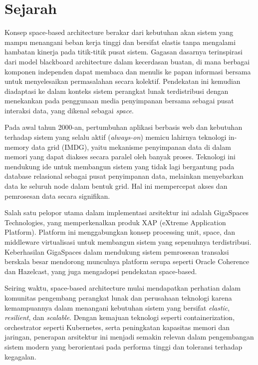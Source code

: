 \section{Sejarah}

Konsep space-based architecture berakar dari kebutuhan akan sistem yang mampu menangani beban kerja tinggi dan bersifat elastis tanpa mengalami hambatan kinerja pada titik-titik pusat sistem. Gagasan dasarnya terinspirasi dari model blackboard architecture dalam kecerdasan buatan, di mana berbagai komponen independen dapat membaca dan menulis ke papan informasi bersama untuk menyelesaikan permasalahan secara kolektif. Pendekatan ini kemudian diadaptasi ke dalam konteks sistem perangkat lunak terdistribusi dengan menekankan pada penggunaan media penyimpanan bersama sebagai pusat interaksi data, yang dikenal sebagai \textit{space}.

Pada awal tahun 2000-an, pertumbuhan aplikasi berbasis web dan kebutuhan terhadap sistem yang selalu aktif (\textit{always-on}) memicu lahirnya teknologi in-memory data grid (IMDG), yaitu mekanisme penyimpanan data di dalam memori yang dapat diakses secara paralel oleh banyak proses. Teknologi ini mendukung ide untuk membangun sistem yang tidak lagi bergantung pada database relasional sebagai pusat penyimpanan data, melainkan menyebarkan data ke seluruh node dalam bentuk grid. Hal ini mempercepat akses dan pemrosesan data secara signifikan.

Salah satu pelopor utama dalam implementasi arsitektur ini adalah GigaSpaces Technologies, yang memperkenalkan produk XAP (eXtreme Application Platform). Platform ini menggabungkan konsep processing unit, space, dan middleware virtualisasi untuk membangun sistem yang sepenuhnya terdistribusi. Keberhasilan GigaSpaces dalam mendukung sistem pemrosesan transaksi berskala besar mendorong munculnya platform serupa seperti Oracle Coherence dan Hazelcast, yang juga mengadopsi pendekatan space-based.

Seiring waktu, space-based architecture mulai mendapatkan perhatian dalam komunitas pengembang perangkat lunak dan perusahaan teknologi karena kemampuannya dalam menangani kebutuhan sistem yang bersifat \textit{elastic}, \textit{resilient}, dan \textit{scalable}. Dengan kemajuan teknologi seperti containerization, orchestrator seperti Kubernetes, serta peningkatan kapasitas memori dan jaringan, penerapan arsitektur ini menjadi semakin relevan dalam pengembangan sistem modern yang berorientasi pada performa tinggi dan toleransi terhadap kegagalan.

